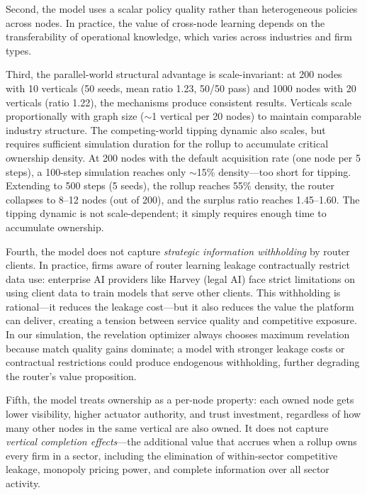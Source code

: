 \documentclass[12pt]{article}
\theoremstyle{definition}
\begin{document}
Second, the model uses a scalar policy quality rather than heterogeneous policies across nodes. In practice, the value of cross-node learning depends on the transferability of operational knowledge, which varies across industries and firm types.

Third, the parallel-world structural advantage is scale-invariant: at 200 nodes with 10 verticals (50 seeds, mean ratio 1.23, 50/50 pass) and 1000 nodes with 20 verticals (ratio 1.22), the mechanisms produce consistent results. Verticals scale proportionally with graph size ($\sim$1 vertical per 20 nodes) to maintain comparable industry structure. The competing-world tipping dynamic also scales, but requires sufficient simulation duration for the rollup to accumulate critical ownership density. At 200 nodes with the default acquisition rate (one node per 5 steps), a 100-step simulation reaches only $\sim$15\% density---too short for tipping. Extending to 500 steps (5 seeds), the rollup reaches 55\% density, the router collapses to 8--12 nodes (out of 200), and the surplus ratio reaches 1.45--1.60. The tipping dynamic is not scale-dependent; it simply requires enough time to accumulate ownership.

Fourth, the model does not capture \textit{strategic information withholding} by router clients. In practice, firms aware of router learning leakage contractually restrict data use: enterprise AI providers like Harvey (legal AI) face strict limitations on using client data to train models that serve other clients. This withholding is rational---it reduces the leakage cost---but it also reduces the value the platform can deliver, creating a tension between service quality and competitive exposure. In our simulation, the revelation optimizer always chooses maximum revelation because match quality gains dominate; a model with stronger leakage costs or contractual restrictions could produce endogenous withholding, further degrading the router's value proposition.

Fifth, the model treats ownership as a per-node property: each owned node gets lower visibility, higher actuator authority, and trust investment, regardless of how many other nodes in the same vertical are also owned. It does not capture \textit{vertical completion effects}---the additional value that accrues when a rollup owns every firm in a sector, including the elimination of within-sector competitive leakage, monopoly pricing power, and complete information over all sector activity.

\end{document}
